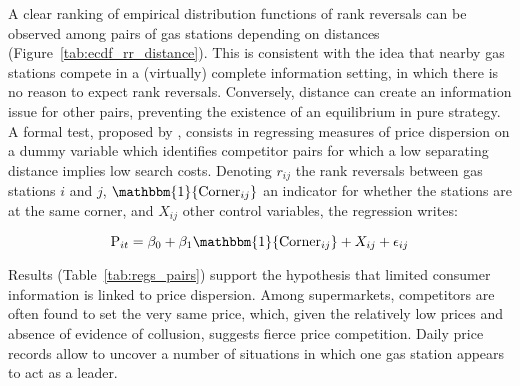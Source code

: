 \documentclass[english]{article}
\begin{document}
A clear ranking of empirical distribution functions of rank reversals can be observed among pairs of gas stations depending on distances (Figure~\ref{tab:ecdf_rr_distance}). This is consistent with the idea that nearby gas stations compete in a (virtually) complete information setting, in which there is no reason to expect rank reversals. Conversely, distance can create an information issue for other pairs, preventing the existence of an equilibrium in pure strategy. A formal test, proposed by \cite{TAP11}, consists in regressing measures of price dispersion on a dummy variable which identifies competitor pairs for which a low separating distance implies low search costs. Denoting $r_{ij}$ the rank reversals between gas stations $i$ and $j$, $\mathbbm{1}{\text{Corner}_{ij}}$ an indicator for whether the stations are at the same corner, and $X_{ij}$ other control variables, the regression writes:

\begin{equation}
\text{P}_{it}= \beta_0 + \beta_1 \mathbbm{1}{\text{Corner}_{ij}} + X_{ij} + \epsilon_{ij}
\end{equation}

Results (Table~\ref{tab:regs_pairs}) support the hypothesis that limited consumer information is linked to price dispersion. Among supermarkets, competitors are often found to set the very same price, which, given the relatively low prices and absence of evidence of collusion, suggests fierce price competition. Daily price records allow to uncover a number of situations in which one gas station appears to act as a leader.
\end{document}
